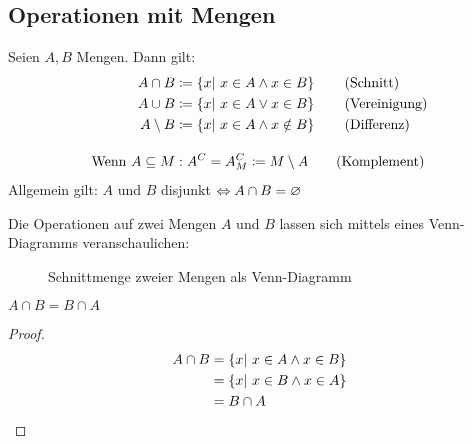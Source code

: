 \subsection{Operationen mit Mengen}

\begin{definition}[Mengenoperationen]
    Seien $A, B$ Mengen. Dann gilt:
    \begin{align*}
        A\cap B &\coloneqq \left\{x|~x\in A \land x\in B\right\}\tag{Schnitt}\\
        A\cup B &\coloneqq \left\{x|~x\in A \lor x\in B\right\}\tag{Vereinigung}\\
        A\setminus B &\coloneqq \left\{x|~x\in A \land x\notin B\right\}\tag{Differenz}\\[10pt]
        \text{Wenn } A\subseteq M&: A^{C} = A^{C}_{M} \coloneqq M\setminus A\tag{Komplement}
    \end{align*}
    Allgemein gilt: $A$ und $B$ disjunkt $\Leftrightarrow{} A\cap B = \varnothing$
\end{definition}

\begin{visualisierung}
    Die Operationen auf zwei Mengen $A$ und $B$ lassen sich mittels eines Venn-Diagramms veranschaulichen:
    \begin{figure}[H]
        \centering
        \caption{Schnittmenge zweier Mengen als Venn-Diagramm}
    \end{figure}
\end{visualisierung}


\begin{lemma}
    $A\cap B = B \cap A$
    \begin{proof}
        \begin{align*}
            A\cap B &= \left\{x|~x\in A \land x \in B\right\}\\
            &= \left\{x|~x\in B \land x \in A\right\}\\
            &= B\cap A\qedhere
        \end{align*}
    \end{proof}
\end{lemma}

